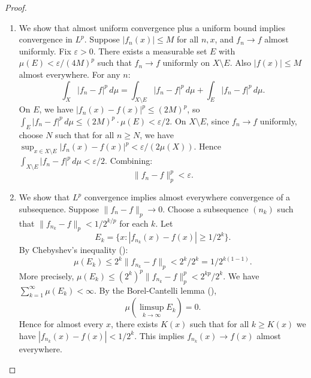 \begin{proof}
\begin{enumerate}
        \item We show that almost uniform convergence plus a uniform bound implies convergence in $L^p$. Suppose $|f_n(x)| \leq M$ for all $n, x$, and $f_n \to f$ almost uniformly. Fix $\varepsilon > 0$. There exists a measurable set $E$ with $\mu(E) < \varepsilon/(4M)^p$ such that $f_n \to f$ uniformly on $X \setminus E$. Also $|f(x)| \leq M$ almost everywhere. For any $n$:
        $$\int_X |f_n - f|^p\,d\mu = \int_{X \setminus E} |f_n - f|^p\,d\mu + \int_E |f_n - f|^p\,d\mu.$$
        On $E$, we have $|f_n(x) - f(x)|^p \leq (2M)^p$, so $\int_E |f_n - f|^p\,d\mu \leq (2M)^p \cdot \mu(E) < \varepsilon/2$. On $X \setminus E$, since $f_n \to f$ uniformly, choose $N$ such that for all $n \geq N$, we have $\sup_{x \in X \setminus E} |f_n(x) - f(x)|^p < \varepsilon/(2\mu(X))$. Hence $\int_{X \setminus E} |f_n - f|^p\,d\mu < \varepsilon/2$. Combining:
        $$\|f_n - f\|_p^p < \varepsilon.$$

        \item We show that $L^p$ convergence implies almost everywhere convergence of a subsequence. Suppose $\|f_n - f\|_p \to 0$. Choose a subsequence $(n_k)$ such that $\|f_{n_k} - f\|_p < 1/2^{k/p}$ for each $k$. Let
        $$E_k = \{x : |f_{n_k}(x) - f(x)| \geq 1/2^{k}\}.$$
        By Chebyshev's inequality ():
        $$\mu(E_k) \leq 2^k \|f_{n_k} - f\|_p < 2^k / 2^k = 1/2^{k(1-1)}.$$
        More precisely, $\mu(E_k) \leq (2^k)^p \|f_{n_k} - f\|_p^p < 2^{kp}/2^k$. We have $\sum_{k=1}^\infty \mu(E_k) < \infty$. By the Borel-Cantelli lemma (),
        $$\mu(\limsup_{k \to \infty} E_k) = 0.$$
        Hence for almost every $x$, there exists $K(x)$ such that for all $k \geq K(x)$ we have $|f_{n_k}(x) - f(x)| < 1/2^k$. This implies $f_{n_k}(x) \to f(x)$ almost everywhere.
    \end{enumerate}
\end{proof}
